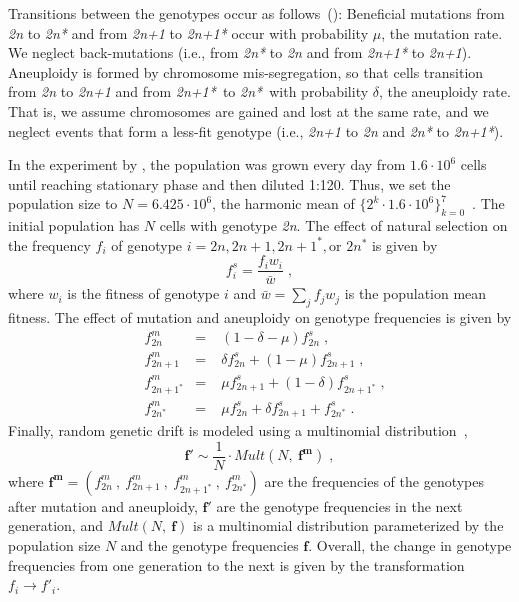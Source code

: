 \documentclass[12pt]{extarticle}
\let\vec\mathbf
\newcommand{\euwt}{\emph{2n}}
\newcommand{\anwt}{\emph{2n+1}}
\newcommand{\eumt}{\emph{2n*}}
\newcommand{\anmt}{\emph{2n+1*}}
\begin{document}
Transitions between the genotypes occur as follows~(): Beneficial mutations from \euwt\; to \eumt\; and from \anwt\; to \anmt\; occur with probability $\mu$, the mutation rate. We neglect back-mutations (i.e., from \eumt\; to \euwt\; and from \anmt\; to \anwt).
Aneuploidy is formed by chromosome mis-segregation, so that cells transition from \euwt\; to \anwt\; and from \anmt\ to \eumt\ with probability $\delta$, the aneuploidy rate. That is, we assume chromosomes are gained and lost at the same rate, and we neglect events that form a less-fit genotype (i.e., \anwt\; to \euwt\; and \eumt\; to \anmt).

In the experiment by \citet{Yona2012}, the population was grown every day from $1.6 \cdot 10^6$ cells until reaching stationary phase and then diluted 1:120.
Thus, we set the population size to $N=6.425 \cdot 10^6$, the harmonic mean of $\{2^k \cdot 1.6 \cdot 10^6\}_{k=0}^{7}$~\citep{Crow1970}.
The initial population has $N$ cells with genotype \euwt. 
The effect of natural selection on the frequency $f_i$ of genotype $i = 2n, 2n+1, 2n+1^*, \text{or } 2n^*$ is given by
    \begin{equation} \label{eq:selection-single} 
      f^s_i = \frac{f_i w_i}{\bar{w}} \;,
    \end{equation}
where $w_i$ is the fitness of genotype $i$ and $\bar{w} = \sum_{j}{f_j w_j}$ is the population mean fitness.
The effect of mutation and aneuploidy on genotype frequencies is given by
    \begin{equation} \label{eq:mutation-aneuploidy-single}
    \begin{aligned}
      &f^m_{2n} &=&\; (1 - \delta - \mu) f^s_{2n}  \;,\\
      &f^m_{2n+1} &=&\; \delta f^s_{2n} + (1 - \mu) f^s_{2n+1}  \;,\\
      &f^m_{2n+1^*} &=&\; \mu f^s_{2n+1} + (1-\delta) f^s_{2n+1^*}  \;,\\
      &f^m_{2n^*} &=&\; \mu f^s_{2n} + \delta f^s_{2n+1} + f^s_{2n^*}  \;.
    \end{aligned}
    \end{equation}
Finally, random genetic drift is modeled using a multinomial distribution~\citep{Otto2007},
    \begin{equation} \label{eq:drift-single}
      \vec{f'} \sim \frac{1}{N} \cdot \mathit{Mult}(N,\ \vec{f^m}) \;,
    \end{equation}
where $\vec{f^m}=(f^m_{2n}\ ,\ f^m_{2n+1}\ ,\ f^m_{2n+1^*}\ ,\ f^m_{2n^*})$ are the frequencies of the genotypes after mutation and aneuploidy, $\vec{f'}$ are the genotype frequencies in the next generation, and $Mult(N,\ \vec{f})$ is a multinomial distribution parameterized by the population size $N$ and the genotype frequencies $\vec{f}$.
Overall, the change in genotype frequencies from one generation to the next is given by the transformation $f_i \to f'_i$.
\end{document}
